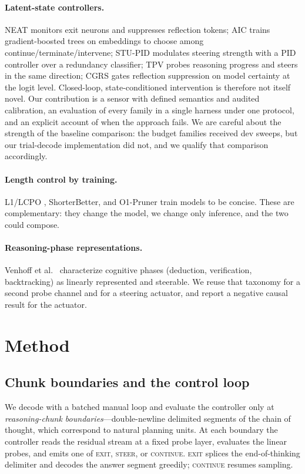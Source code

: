 \paragraph{Latent-state controllers.} NEAT \cite{neat} monitors exit
neurons and suppresses reflection tokens; AIC \cite{aic} trains gradient-boosted
trees on embeddings to choose among continue/terminate/intervene; STU-PID
\cite{stupid} modulates steering strength with a PID controller over a
redundancy classifier; TPV \cite{tpv} probes reasoning progress and steers in
the same direction; CGRS \cite{cgrs} gates reflection suppression on model
certainty at the logit level. Closed-loop, state-conditioned intervention is
therefore not itself novel. Our contribution is a sensor with defined semantics and
audited calibration, an evaluation of every family in a single harness under
one protocol, and an explicit account of when the approach fails. We are
careful about the strength of the baseline comparison: the budget families
received dev sweeps, but our trial-decode implementation did not, and we
qualify that comparison accordingly.

\paragraph{Length control by training.} L1/LCPO \cite{l1}, ShorterBetter, and
O1-Pruner train models to be concise. These are complementary: they change the
model, we change only inference, and the two could compose.

\paragraph{Reasoning-phase representations.} Venhoff et al.\ \cite{venhoff}
characterize cognitive phases (deduction, verification, backtracking) as
linearly represented and steerable. We reuse that taxonomy for a second probe
channel and for a steering actuator, and report a negative causal result for
the actuator.

\section{Method}

\subsection{Chunk boundaries and the control loop}

We decode with a batched manual loop and evaluate the controller only at
\emph{reasoning-chunk boundaries}---double-newline delimited segments of the
chain of thought, which correspond to natural planning units. At each boundary
the controller reads the residual stream at a fixed probe layer, evaluates the
linear probes, and emits one of \textsc{exit}, \textsc{steer}, or
\textsc{continue}. \textsc{exit} splices the end-of-thinking delimiter and
decodes the answer segment greedily; \textsc{continue} resumes sampling.

